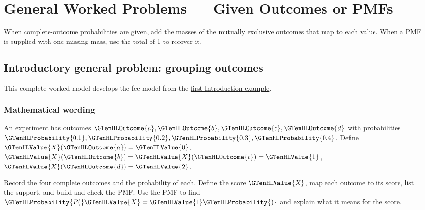 
\section{General Worked Problems --- Given Outcomes or PMFs}\label{sec:t2-c1-given-outcomes-or-pmfs}

 \vspace{5mm}

When complete-outcome probabilities are given, add the masses of the mutually exclusive outcomes that map to each value. When a PMF is supplied with one missing mass, use the total of 1 to recover it.

\subsection{Introductory general problem: grouping outcomes}
\label{subsec:t2-c1-introductory-general-problem-grouping-outcomes}
This complete worked model develops the fee model from the \hyperref[subsec:t2-c1-given-outcomes]{first Introduction example}.

\subsubsection*{Mathematical wording}
An experiment has outcomes $\GTenHLOutcome{a},\GTenHLOutcome{b},\GTenHLOutcome{c},\GTenHLOutcome{d}$ with probabilities $\GTenHLProbability{0.1},\GTenHLProbability{0.2},\GTenHLProbability{0.3},\GTenHLProbability{0.4}$. Define $\GTenHLValue{X}(\GTenHLOutcome{a})=\GTenHLValue{0}$, $\GTenHLValue{X}(\GTenHLOutcome{b})=\GTenHLValue{X}(\GTenHLOutcome{c})=\GTenHLValue{1}$, $\GTenHLValue{X}(\GTenHLOutcome{d})=\GTenHLValue{2}$.

    {Record the four complete outcomes and the probability of each.}
    {Define the score $\GTenHLValue{X}$, map each outcome to its score, list the support, and build and check the PMF.}
    {Use the PMF to find $\GTenHLProbability{P(}\GTenHLValue{X}=\GTenHLValue{1}\GTenHLProbability{)}$ and explain what it means for the score.}

